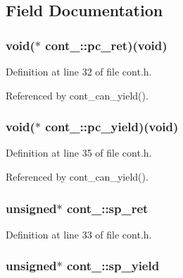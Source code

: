 \subsection{Field Documentation}
\hypertarget{structcont___acf27e0bad3e49daaabf8c8fd48886a0f}{
\subsubsection[{pc\-\_\-ret}]{\setlength{\rightskip}{0pt plus 5cm}void($\ast$ cont\-\_\-\-::pc\-\_\-ret)(void)}}\label{structcont___acf27e0bad3e49daaabf8c8fd48886a0f}


Definition at line 32 of file cont.\-h.



Referenced by cont\-\_\-can\-\_\-yield().

\hypertarget{structcont___ac2253c7d6fab95efa2c4196783b0dc4e}{
\subsubsection[{pc\-\_\-yield}]{\setlength{\rightskip}{0pt plus 5cm}void($\ast$ cont\-\_\-\-::pc\-\_\-yield)(void)}}\label{structcont___ac2253c7d6fab95efa2c4196783b0dc4e}


Definition at line 35 of file cont.\-h.



Referenced by cont\-\_\-can\-\_\-yield().

\hypertarget{structcont___a2f886d4182bed43aaf66d3a55a2d23b7}{
\subsubsection[{sp\-\_\-ret}]{\setlength{\rightskip}{0pt plus 5cm}unsigned$\ast$ cont\-\_\-\-::sp\-\_\-ret}}\label{structcont___a2f886d4182bed43aaf66d3a55a2d23b7}


Definition at line 33 of file cont.\-h.

\hypertarget{structcont___a59ce8d64c25ff1d02ae24c61080bbf7c}{
\subsubsection[{sp\-\_\-yield}]{\setlength{\rightskip}{0pt plus 5cm}unsigned$\ast$ cont\-\_\-\-::sp\-\_\-yield}}\label{structcont___a59ce8d64c25ff1d02ae24c61080bbf7c}


